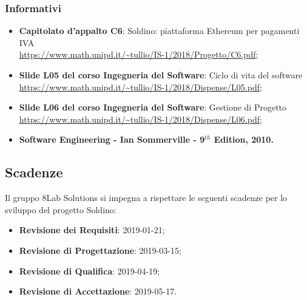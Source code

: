 \subsubsection{Informativi}
\begin{itemize}
	\item \textbf{Capitolato d'appalto C6}: Soldino: piattaforma Ethereum per pagamenti IVA \\
	\url{https://www.math.unipd.it/~tullio/IS-1/2018/Progetto/C6.pdf};
	\item \textbf{Slide L05 del corso Ingegneria del Software}: Ciclo di vita 
	del software \\
	\url{https://www.math.unipd.it/~tullio/IS-1/2018/Dispense/L05.pdf};
	\item \textbf{Slide L06 del corso Ingegneria del Software}: Gestione di 
	Progetto \\
	\url{https://www.math.unipd.it/~tullio/IS-1/2018/Dispense/L06.pdf};
	\item \textbf{Software Engineering - Ian Sommerville - 9$^{th}$ Edition, 
	2010.}
\end{itemize}

\hypertarget{scadenze}{\subsection{Scadenze}}
Il gruppo 8Lab Solutions si impegna a rispettare le seguenti scadenze per lo 
sviluppo del progetto Soldino:

\begin{itemize}
	\item \textbf{Revisione dei Requisiti}: 2019-01-21;
	\item \textbf{Revisione di Progettazione}: 2019-03-15;
	\item \textbf{Revisione di Qualifica}: 2019-04-19;
	\item \textbf{Revisione di Accettazione}: 2019-05-17.
\end{itemize}